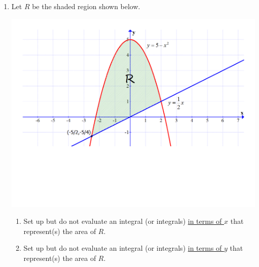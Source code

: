 \documentclass[12pt]{article}
\newif\ifans
\begin{document}
\begin{enumerate}

\item Let $R$ be the shaded region shown below.

\begin{center}

\includegraphics[scale=0.5]{graph3.pdf}

\end{center}

\begin{enumerate} 

\item Set up but do not evaluate an integral (or integrals) \underline{in terms of $x$} that represent(s) the area of $R$. 

\ifans{\fbox{$\int_{-\frac{5}{2}}^2 \left(-x^2-\frac{1}{2}x+5\right) \,dx$}} \fi

\item Set up but do not evaluate an integral (or integrals) \underline{in terms of $y$} that represent(s) the area of $R$. 

\ifans{\fbox{$\int_{-\frac{5}{4}}^1 \left(2y+\sqrt{5-y}\right) \,dy+2\int_1^5 \sqrt{5-y} \,dy$}} \fi

\end{enumerate}

\end{enumerate}

\newpage

\end{document}
